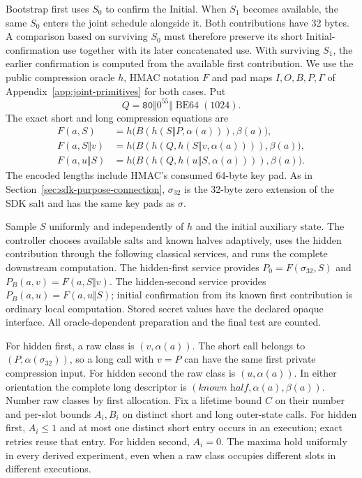 \documentclass[pdflatex]{sn-jnl}
\theoremstyle{thmstyleone}
\theoremstyle{thmstylethree}
\theoremstyle{thmstyletwo}
\begin{document}
Bootstrap first uses $S_0$ to confirm the Initial. When $S_1$
becomes available, the same $S_0$ enters the joint schedule alongside
it. Both contributions have 32 bytes. A comparison based on surviving
$S_0$ must therefore preserve its short Initial-confirmation use together
with its later concatenated use. With surviving $S_1$, the earlier
confirmation is computed from the available first contribution. We use the public
compression oracle $h$, HMAC notation $F$ and pad maps $I,O,B,P,\Gamma$
of Appendix~\ref{app:joint-primitives} for both cases. Put
\[
 Q=\mathtt{80}\Vert0^{55}\Vert\operatorname{BE64}(1024).
\]
The exact short and long compression equations are
\begin{align}
 F(a,S)&=h\bigl(B(h(S\Vert P,\alpha(a))),\beta(a)\bigr),\nonumber\\
 F(a,S\Vert v)&=h\bigl(B(h(Q,h(S\Vert v,\alpha(a)))),\beta(a)\bigr),
 \label{eq:bootstrap-compression}\\
 F(a,u\Vert S)&=h\bigl(B(h(Q,h(u\Vert S,\alpha(a)))),\beta(a)\bigr).
 \nonumber
\end{align}
The encoded lengths include HMAC's consumed 64-byte key pad. As in
Section~\ref{sec:sdk-purpose-connection}, $\sigma_{32}$ is the 32-byte
zero extension of the SDK salt and has the same key pads as $\sigma$.

Sample $S$ uniformly and independently of $h$ and the initial auxiliary
state. The controller chooses available salts and known halves adaptively,
uses the hidden contribution through the following classical services,
and runs the complete downstream computation. The hidden-first service
provides $P_0=F(\sigma_{32},S)$ and $P_B(a,v)=F(a,S\Vert v)$.
The hidden-second service provides $P_B(a,u)=F(a,u\Vert S)$;
initial confirmation from its known first contribution is ordinary local
computation. Stored secret values have the declared opaque interface.
All oracle-dependent preparation and the final test are counted.

For hidden first, a raw class is $(v,\alpha(a))$. The short call belongs
to $(P,\alpha(\sigma_{32}))$, so a long call with $v=P$ can have the
same first private compression input. For hidden second the raw class is
$(u,\alpha(a))$. In either orientation the complete long descriptor is
$(\textit{known half},\alpha(a),\beta(a))$.
Number raw classes by first allocation. Fix a lifetime bound $C$ on
their number and per-slot bounds $A_i,B_i$ on distinct short and long
outer-state calls. For hidden first, $A_i\le1$ and at most one distinct
short entry occurs in an execution; exact retries reuse that entry.
For hidden second, $A_i=0$. The maxima
hold uniformly in every derived experiment, even when a raw class
occupies different slots in different executions.
\end{document}

